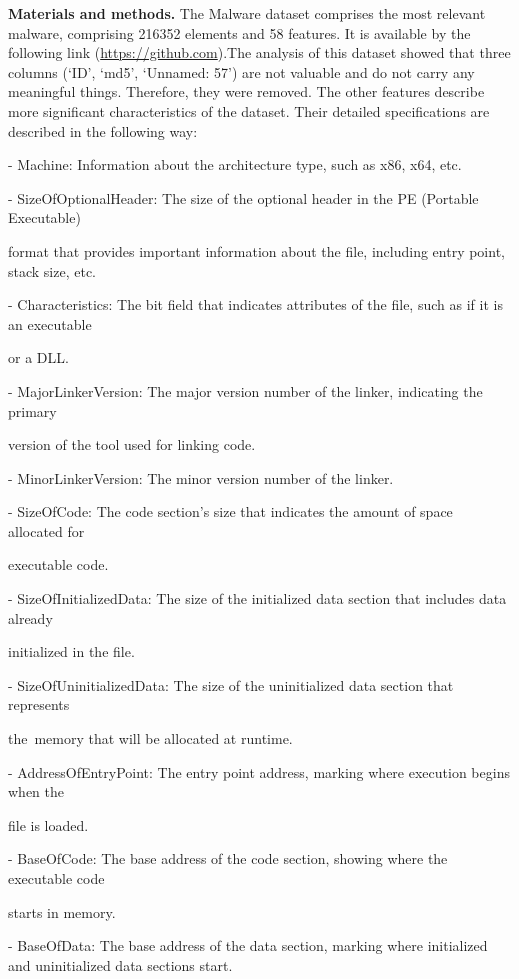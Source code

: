 \begin{multicols}{2}
{\bfseries Materials and methods.} The Malware dataset comprises the most
relevant malware, comprising 216352 elements and 58 features. It is
available by the following link
(\href{https://github.com/saurabh48782/Malware_Classification/blob/master/MalwareData.csv}{https://github.com}).The
analysis of this dataset showed that three columns (`ID', `md5',
`Unnamed: 57') are not valuable and do not carry any meaningful things.
Therefore, they were removed. The other features describe more
significant characteristics of the dataset. Their detailed
specifications are described in the following way:

- Machine: Information about the architecture type, such as x86, x64,
etc.

- SizeOfOptionalHeader: The size of the optional header in the PE
(Portable Executable)

format that provides important information about the file, including
entry point, stack size, etc.

- Characteristics: The bit field that indicates attributes of the file,
such as if it is an executable

or a DLL.

- MajorLinkerVersion: The major version number of the linker, indicating
the primary

version of the tool used for linking code.

- MinorLinkerVersion: The minor version number of the linker.

- SizeOfCode: The code section's size that indicates the amount of space
allocated for

executable code.

- SizeOfInitializedData: The size of the initialized data section that
includes data already

initialized in the file.

- SizeOfUninitializedData: The size of the uninitialized data section
that represents

the~memory that will be allocated at runtime.

- AddressOfEntryPoint: The entry point address, marking where execution
begins when the

file is loaded.

- BaseOfCode: The base address of the code section, showing where the
executable code

starts in memory.

- BaseOfData: The base address of the data section, marking where
initialized and uninitialized data sections start.


\end{multicols}
